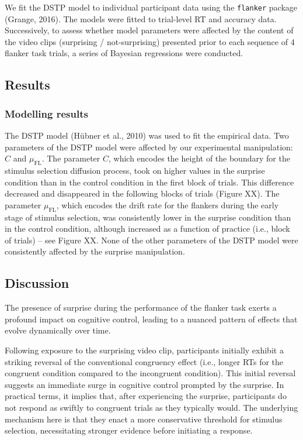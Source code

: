 \documentclass[
  man]{apa7}
\begin{document}
We fit the DSTP model to individual participant data using the \texttt{flanker} package (Grange, 2016). The models were fitted to trial-level RT and accuracy data. Successively, to assess whether model parameters were affected by the content of the video clips (surprising / not-surprising) presented prior to each sequence of 4 flanker task trials, a series of Bayesian regressions were conducted.

\hypertarget{results}{%
\subsection{Results}\label{results}}

\hypertarget{modelling-results}{%
\subsubsection{Modelling results}\label{modelling-results}}

The DSTP model (Hübner et al., 2010) was used to fit the empirical data.
Two parameters of the DSTP model were affected by our experimental manipulation: \(C\) and \(\mu_{\text{FL}}\). The parameter \(C\), which encodes the height of the boundary for the stimulus selection diffusion process, took on higher values in the surprise condition than in the control condition in the first block of trials. This difference decreased and disappeared in the following blocks of trials (Figure XX). The parameter \(\mu_{\text{FL}}\), which encodes the drift rate for the flankers during the early stage of stimulus selection, was consistently lower in the surprise condition than in the control condition, although increased as a function of practice (i.e., block of trials) -- see Figure XX. None of the other parameters of the DSTP model were consistently affected by the surprise manipulation.

\hypertarget{discussion}{%
\subsection{Discussion}\label{discussion}}

The presence of surprise during the performance of the flanker task exerts a profound impact on cognitive control, leading to a nuanced pattern of effects that evolve dynamically over time.

Following exposure to the surprising video clip, participants initially exhibit a striking reversal of the conventional congruency effect (i.e., longer RTs for the congruent condition compared to the incongruent condition). This initial reversal suggests an immediate surge in cognitive control prompted by the surprise. In practical terms, it implies that, after experiencing the surprise, participants do not respond as swiftly to congruent trials as they typically would. The underlying mechanism here is that they enact a more conservative threshold for stimulus selection, necessitating stronger evidence before initiating a response.
\end{document}

